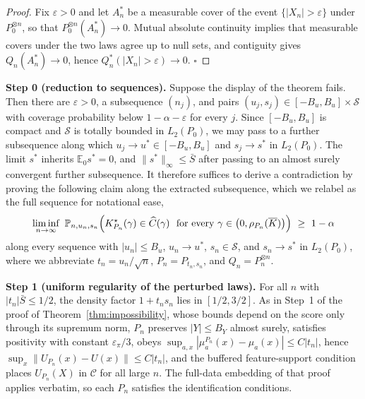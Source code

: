 \documentclass[11pt]{article}
\newcommand{\E}{\mathbb E}
\newcommand{\Pp}{\mathbb P}
\newcommand{\calC}{\mathcal C}
\newcommand{\calS}{\mathcal S}
\newcommand{\eps}{\varepsilon}
\newcommand{\norm}[1]{\lVert #1\rVert}
\begin{document}
\begin{proof}
Fix $\eps>0$ and let $A_n^\ast$ be a measurable cover of the event $\{|X_n|>\eps\}$ under $P_0^{\otimes n}$, so that $P_0^{\otimes n}(A_n^\ast)\to0$. Mutual absolute continuity implies that measurable covers under the two laws agree up to null sets, and contiguity gives $Q_n(A_n^\ast)\to0$, hence $Q_n^\ast(|X_n|>\eps)\to0$. \hfill$\square$
\end{proof}

\textbf{Step 0 (reduction to sequences).} Suppose the display of the theorem fails. Then there are $\eps>0$, a subsequence $(n_j)$, and pairs $(u_j,s_j)\in[-B_u,B_u]\times\calS$ with coverage probability below $1-\alpha-\eps$ for every $j$. Since $[-B_u,B_u]$ is compact and $\calS$ is totally bounded in $L_2(P_0)$, we may pass to a further subsequence along which $u_j\to u^\ast\in[-B_u,B_u]$ and $s_j\to s^\ast$ in $L_2(P_0)$. The limit $s^\ast$ inherits $\E_0s^\ast=0$, and $\norm{s^\ast}_\infty\le\bar S$ after passing to an almost surely convergent further subsequence. It therefore suffices to derive a contradiction by proving the following claim along the extracted subsequence, which we relabel as the full sequence for notational ease,
\begin{equation}\label{eq:seqclaim}
\liminf_{n\to\infty}\ \Pp_{n,u_n,s_n}\Bigl(K^\star_{P_n}(\gamma)\in\widehat C(\gamma)\ \text{ for every }\gamma\in\bigl(0,\rho_{P_n}(\overline K)\bigr)\Bigr)\ \ge\ 1-\alpha
\end{equation}
along every sequence with $|u_n|\le B_u$, $u_n\to u^\ast$, $s_n\in\calS$, and $s_n\to s^\ast$ in $L_2(P_0)$, where we abbreviate $t_n=u_n/\sqrt n$, $P_n=P_{t_n,s_n}$, and $Q_n=P_n^{\otimes n}$.

\textbf{Step 1 (uniform regularity of the perturbed laws).} For all $n$ with $|t_n|\bar S\le1/2$, the density factor $1+t_ns_n$ lies in $[1/2,3/2]$. As in Step~1 of the proof of Theorem~\ref{thm:impossibility}, whose bounds depend on the score only through its supremum norm, $P_n$ preserves $|Y|\le B_Y$ almost surely, satisfies positivity with constant $\eps_\pi/3$, obeys $\sup_{a,x}|\mu^{P_n}_a(x)-\mu_a(x)|\le C|t_n|$, hence $\sup_x\norm{U_{P_n}(x)-U(x)}\le C|t_n|$, and the buffered feature-support condition places $U_{P_n}(X)$ in $\calC$ for all large $n$. The full-data embedding of that proof applies verbatim, so each $P_n$ satisfies the identification conditions.
\end{document}
